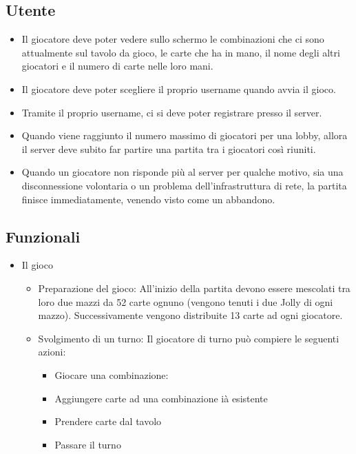 \documentclass{article}
\begin{document}
    \subsection{Utente}\label{subsec:utente}
    \begin{itemize}
        \item Il giocatore deve poter vedere sullo schermo le combinazioni che ci sono attualmente sul tavolo da gioco,
        le carte che ha in mano, il nome degli altri giocatori e il numero di carte nelle loro mani.
        \item Il giocatore deve poter scegliere il proprio username quando avvia il gioco.
        \item Tramite il proprio username, ci si deve poter registrare presso il server.
        \item Quando viene raggiunto il numero massimo di giocatori per una lobby, allora il server deve subito far
        partire una partita tra i giocatori così riuniti.
        \item Quando un giocatore non risponde più al server per qualche motivo, sia una disconnessione volontaria o un
        problema dell’infrastruttura di rete, la partita finisce immediatamente, venendo visto come un abbandono.

    \end{itemize}

    \subsection{Funzionali}
    \begin{itemize}
        \item Il gioco
        \begin{itemize}
            \item Preparazione del gioco:
            All'inizio della partita devono essere mescolati tra loro due mazzi da 52 carte ognuno (vengono tenuti
            i due Jolly di ogni mazzo). Successivamente vengono distribuite 13 carte ad ogni giocatore.
            \item Svolgimento di un turno:
            Il giocatore di turno può compiere le seguenti azioni:
            \begin{itemize}
                \item Giocare una combinazione:
                \item Aggiungere carte ad una combinazione ià esistente
                \item Prendere carte dal tavolo
                \item Passare il turno
            \end{itemize}
        \end{itemize}
    \end{itemize}
\end{document}
